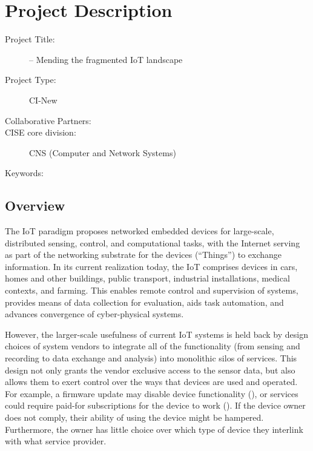 
\section{Project Description}


\begin{description}
  \item[Project Title:] \sysname -- Mending the fragmented \acrshort{IoT} landscape
  \item[Project Type:] CI-New 
  \item[Collaborative Partners:] 
  \item[CISE core division:] CNS (Computer and Network Systems)
  \item[Keywords:] 
\end{description}


\subsection{Overview}

The \acrfull{IoT} paradigm proposes networked embedded devices
for large-scale, distributed sensing, control, and computational tasks,
with the Internet serving as part of the networking substrate for
the devices (``Things'') to exchange information.
In its current realization today, the \acrlong{IoT} comprises
devices in cars, homes and other buildings, public transport,
industrial installations, medical contexts, and farming.
This enables remote control and supervision of systems, provides
means of data collection for evaluation, aids
task automation, and advances convergence of cyber-physical systems.

However, the larger-scale usefulness of current \acrlong{IoT}
systems is held back by design choices of system vendors to
integrate all of the functionality (from sensing and recording
to data exchange and analysis) into monolithic silos of services.
This design not only grants the vendor exclusive access to the
sensor data, but also allows them to exert control over the ways
that devices are used and operated. For example, a firmware update
may disable device functionality (), or services could
require paid-for subscriptions for the device to work
().
If the device owner does not comply, their ability of using
the device might be hampered. Furthermore, the owner has little
choice over which type of device they interlink with what service
provider.

